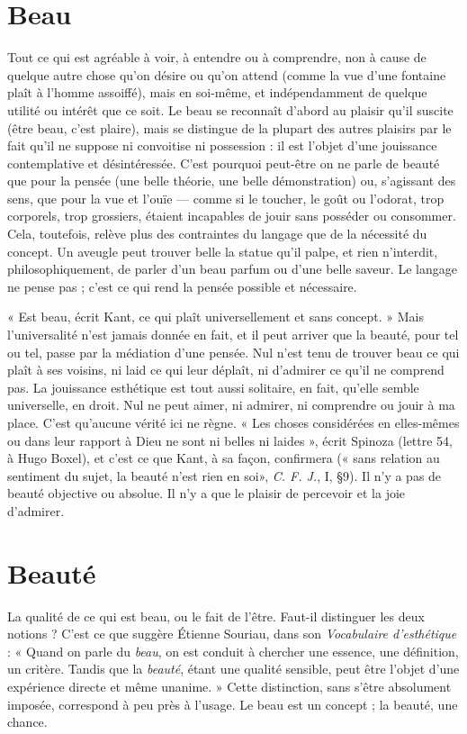 \section{Beau}
Tout ce qui est agréable à voir, à entendre ou à comprendre, non à
cause de quelque autre chose qu’on désire ou qu’on attend (comme la
vue d’une fontaine plaît à l’homme assoiffé), mais en soi-même, et indépendamment
de quelque utilité ou intérêt que ce soit. Le beau se reconnaît d’abord
au plaisir qu’il suscite (être beau, c’est plaire), mais se distingue de la plupart
des autres plaisirs par le fait qu’il ne suppose ni convoitise ni possession : il est
l’objet d’une jouissance contemplative et désintéressée. C’est pourquoi peut-être
on ne parle de beauté que pour la pensée (une belle théorie, une belle
démonstration) ou, s’agissant des sens, que pour la vue et l’ouïe — comme si le
toucher, le goût ou l’odorat, trop corporels, trop grossiers, étaient incapables de
jouir sans posséder ou consommer. Cela, toutefois, relève plus des contraintes
du langage que de la nécessité du concept. Un aveugle peut trouver belle la
statue qu’il palpe, et rien n’interdit, philosophiquement, de parler d’un beau
parfum ou d’une belle saveur. Le langage ne pense pas ; c’est ce qui rend la
pensée possible et nécessaire.

« Est beau, écrit Kant, ce qui plaît universellement et sans concept. » Mais
l'universalité n’est jamais donnée en fait, et il peut arriver que la beauté, pour
tel ou tel, passe par la médiation d’une pensée. Nul n’est tenu de trouver beau
ce qui plaît à ses voisins, ni laid ce qui leur déplaît, ni d'admirer ce qu’il ne
comprend pas. La jouissance esthétique est tout aussi solitaire, en fait, qu’elle
semble universelle, en droit. Nul ne peut aimer, ni admirer, ni comprendre ou
jouir à ma place. C’est qu'aucune vérité ici ne règne. « Les choses considérées
en elles-mêmes ou dans leur rapport à Dieu ne sont ni belles ni laides », écrit
Spinoza (lettre 54, à Hugo Boxel), et c’est ce que Kant, à sa façon, confirmera
(« sans relation au sentiment du sujet, la beauté n’est rien en soi», {\it C. F. J.}, I,
\S 9). Il n’y a pas de beauté objective ou absolue. Il n’y a que le plaisir de percevoir
et la joie d'admirer.

\section{Beauté}
La qualité de ce qui est beau, ou le fait de l’être. Faut-il distinguer
les deux notions ? C’est ce que suggère Étienne Souriau, dans son
{\it Vocabulaire d'esthétique} : « Quand on parle du {\it beau}, on est conduit à chercher
une essence, une définition, un critère. Tandis que la {\it beauté}, étant une qualité
sensible, peut être l’objet d’une expérience directe et même unanime. » Cette
distinction, sans s’être absolument imposée, correspond à peu près à l'usage. Le
beau est un concept ; la beauté, une chance.

